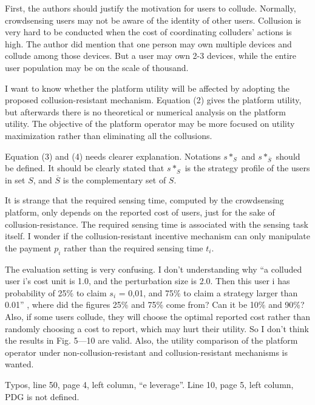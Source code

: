 \documentclass[a4paper,11pt]{exam}
\begin{document}
\begin{questions}
\question First, the authors should justify the motivation for users to collude. Normally, crowdsensing users may not be aware of the identity of other users. Collusion is very hard to be conducted when the cost of coordinating colluders’ actions is high. The author did mention that one person may own multiple devices and collude among those devices. But a user may own 2-3 devices, while the entire user population may be on the scale of thousand. 

\question I want to know whether the platform utility will be affected by adopting the proposed collusion-resistant mechanism. Equation (2) gives the platform utility, but afterwards there is no theoretical or numerical analysis on the platform utility. The objective of the platform operator may be more focused on utility maximization rather than eliminating all the collusions.

\question Equation (3) and (4) needs clearer explanation. Notations $s*_S$ and $s*_{\overline{S}}$ should be defined. It should be clearly stated that $s*_S$ is the strategy profile of the users in set $S$, and $\overline{S}$ is the complementary set of $S$. 

\question It is strange that the required sensing time, computed by the crowdsensing platform, only depends on the reported cost of users, just for the sake of collusion-resistance. The required sensing time is associated with the sensing task itself. I wonder if the collusion-resistant incentive mechanism can only manipulate the payment $p_i$ rather than the required sensing time $t_i$. 

\question The evaluation setting is very confusing. I don’t understanding why “a colluded user i’s cost unit is 1.0, and the perturbation size is 2.0. Then this user i has probability of 25\% to claim $s_i$ = 0,01, and 75\% to claim a strategy larger than 0.01” , where did the figures 25\% and 75\% come from? Can it be 10\% and 90\%? Also, if some users collude, they will choose the optimal reported cost rather than randomly choosing a cost to report, which may hurt their utility.  So I don’t think the results in Fig. 5---10 are valid. Also, the utility comparison of the platform operator under non-collusion-resistant and collusion-resistant mechanisms is wanted. 

\question Typos, line 50, page 4, left column, “e leverage”. Line 10, page 5, left column, PDG is not defined.
\end{questions}
\end{document}

